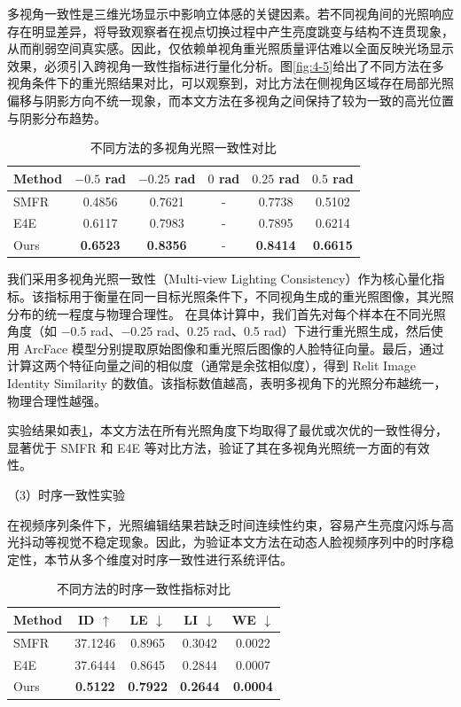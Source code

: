 多视角一致性是三维光场显示中影响立体感的关键因素。若不同视角间的光照响应存在明显差异，将导致观察者在视点切换过程中产生亮度跳变与结构不连贯现象，从而削弱空间真实感。因此，仅依赖单视角重光照质量评估难以全面反映光场显示效果，必须引入跨视角一致性指标进行量化分析。图\ref{fig:4-5}给出了不同方法在多视角条件下的重光照结果对比，可以观察到，对比方法在侧视角区域存在局部光照偏移与阴影方向不统一现象，而本文方法在多视角之间保持了较为一致的高光位置与阴影分布趋势。

\begin{table}[htbp]
  \centering
  \caption{不同方法的多视角光照一致性对比}
  \label{tab:multiview_consistency}
  \begin{tabular}{lccccc}
    \toprule
    Method & $-0.5$ rad & $-0.25$ rad & $0$ rad & $0.25$ rad & $0.5$ rad \\
    \midrule
    SMFR   & 0.4856     & 0.7621      & -       & 0.7738     & 0.5102    \\
    E4E    & 0.6117     & 0.7983      & -       & 0.7895     & 0.6214    \\
    Ours   & \textbf{0.6523} & \textbf{0.8356} & -       & \textbf{0.8414} & \textbf{0.6615} \\
    \bottomrule
  \end{tabular}
\end{table}
我们采用多视角光照一致性（Multi-view Lighting Consistency）作为核心量化指标。该指标用于衡量在同一目标光照条件下，不同视角生成的重光照图像，其光照分布的统一程度与物理合理性。
在具体计算中，我们首先对每个样本在不同光照角度（如 −0.5 rad、−0.25 rad、0.25 rad、0.5 rad）下进行重光照生成，然后使用 ArcFace 模型分别提取原始图像和重光照后图像的人脸特征向量。最后，通过计算这两个特征向量之间的相似度（通常是余弦相似度），得到 Relit Image Identity Similarity 的数值。该指标数值越高，表明多视角下的光照分布越统一，物理合理性越强。

实验结果如表\ref{tab:multiview_consistency}，本文方法在所有光照角度下均取得了最优或次优的一致性得分，显著优于 SMFR 和 E4E 等对比方法，验证了其在多视角光照统一方面的有效性。



（3）时序一致性实验

在视频序列条件下，光照编辑结果若缺乏时间连续性约束，容易产生亮度闪烁与高光抖动等视觉不稳定现象。因此，为验证本文方法在动态人脸视频序列中的时序稳定性，本节从多个维度对时序一致性进行系统评估。
\begin{table}[htbp]
  \centering
  \caption{不同方法的时序一致性指标对比}
  \label{tab:temporal_consistency}
  \begin{tabular}{lcccc}
    \toprule
    Method & ID $\uparrow$ & LE $\downarrow$ & LI $\downarrow$ & WE $\downarrow$ \\
    \midrule
    SMFR   & 37.1246       & 0.8965          & 0.3042          & 0.0022          \\
    E4E    & 37.6444       & 0.8645          & 0.2844          & 0.0007          \\
    Ours   & \textbf{0.5122} & \textbf{0.7922} & \textbf{0.2644} & \textbf{0.0004} \\
    \bottomrule
  \end{tabular}
\end{table}


